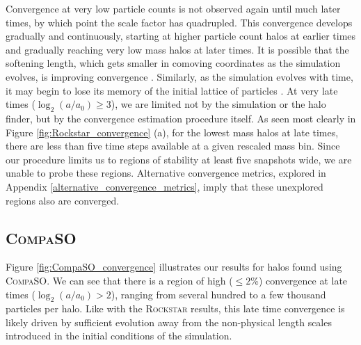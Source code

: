 Convergence at very low particle counts is not observed again until much later times, by which point the scale factor has quadrupled. This convergence develops gradually and continuously, starting at higher particle count halos at earlier times and gradually reaching very low mass halos at later times.  It is possible that the softening length, which gets smaller in comoving coordinates as the simulation evolves, is improving convergence \cite{Garrison_2021_softening}. Similarly, as the simulation evolves with time, it may begin to lose its memory of the initial lattice of particles \cite[see][for further discussion]{Joyce_2021, Maleubre_2022}. At very late times ($\log_2(a/a_0)\geq3$), we are limited not by the simulation or the halo finder, but by the convergence estimation procedure itself. As seen most clearly in Figure \ref{fig:Rockstar_convergence} (a), for the lowest mass halos at late times, there are less than five time steps available at a given rescaled mass bin. Since our procedure limits us to regions of stability at least five snapshots wide, we are unable to probe these regions. Alternative convergence metrics, explored in Appendix \ref{alternative_convergence_metrics}, imply that these unexplored regions also are converged.

\subsection{\textsc{CompaSO}}\label{compaso_results}
Figure \ref{fig:CompaSO_convergence} illustrates our results for halos found using \textsc{CompaSO}. We can see that there is a region of high ($\leq2$\%) convergence at late times ($\log_2 (a/a_0) > 2$), ranging from several hundred to a few thousand particles per halo. Like with the \textsc{Rockstar} results, this late time convergence is likely driven by sufficient evolution away from the non-physical length scales introduced in the initial conditions of the simulation.

